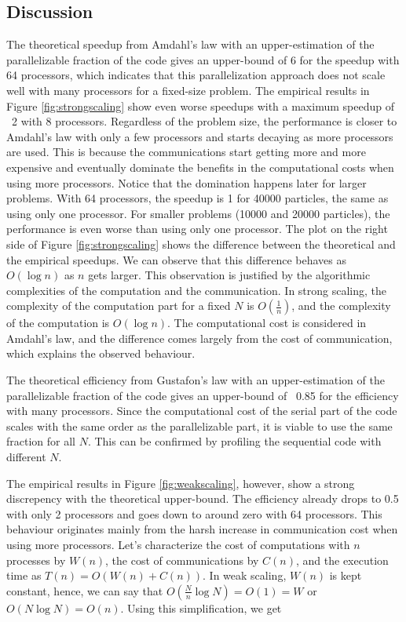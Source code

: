 \documentclass[10pt,journal,compsocconf]{IEEEtran}
\begin{document}
\subsection{Discussion}

The theoretical speedup from Amdahl's law with an upper-estimation of the parallelizable fraction of the code gives an upper-bound of 6 for the speedup with 64 processors, which indicates that this parallelization approach does not scale well with many processors for a fixed-size problem. The empirical results in Figure \ref{fig:strongscaling} show even worse speedups with a maximum speedup of ~2 with 8 processors. Regardless of the problem size, the performance is closer to Amdahl's law with only a few processors and starts decaying as more processors are used. This is because the communications start getting more and more expensive and eventually dominate the benefits in the computational costs when using more processors. Notice that the domination happens later for larger problems. With 64 processors, the speedup is 1 for 40000 particles, the same as using only one processor. For smaller problems (10000 and 20000 particles), the performance is even worse than using only one processor. The plot on the right side of Figure \ref{fig:strongscaling} shows the difference between the theoretical and the empirical speedups. We can observe that this difference behaves as $O(\log n)$ as $n$ gets larger. This observation is justified by the algorithmic complexities of the computation and the communication. In strong scaling, the complexity of the computation part for a fixed $N$ is $O(\frac{1}{n})$, and the complexity of the computation is $O(\log n)$. The computational cost is considered in Amdahl's law, and the difference comes largely from the cost of communication, which explains the observed behaviour.

The theoretical efficiency from Gustafon's law with an upper-estimation of the parallelizable fraction of the code gives an upper-bound of ~0.85 for the efficiency with many processors. Since the computational cost of the serial part of the code scales with the same order as the parallelizable part, it is viable to use the same fraction for all $N$. This can be confirmed by profiling the sequential code with different $N$.

The empirical results in Figure \ref{fig:weakscaling}, however, show a strong discrepency with the theoretical upper-bound. The efficiency already drops to 0.5 with only 2 processors and goes down to around zero with 64 processors. This behaviour originates mainly from the harsh increase in communication cost when using more processors. Let's characterize the cost of computations with $n$ processes by $W(n)$, the cost of communications by $C(n)$, and the execution time as $T(n) = O(W(n) + C(n))$. In weak scaling, $W(n)$ is kept constant, hence, we can say that $O(\frac{N}{n} \log N) = O(1) = W$ or $O(N \log N) = O(n)$. Using this simplification, we get
\end{document}
